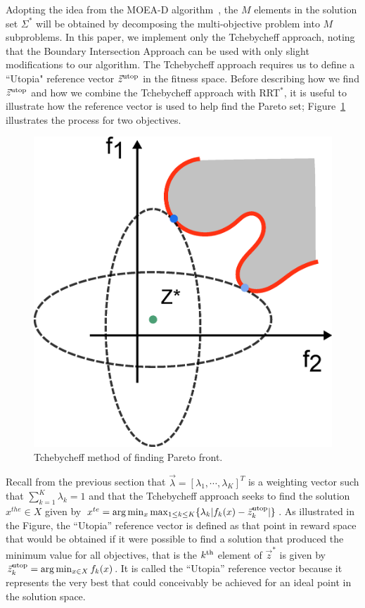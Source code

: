 \documentclass{article}
\begin{document}
Adopting the idea from the MOEA-D algorithm~\cite{4358754}, the $M$ elements in the solution set $\Sigma^{*}$ will be obtained by decomposing the multi-objective problem into $ M $ subproblems.  
In this paper, we implement only the Tchebycheff approach, noting that the Boundary Intersection Approach can be used with only slight modifications to our algorithm. The Tchebycheff approach requires us to define a ``Utopia" reference vector $ \vec{z}^{\rm utop} $ in the fitness space. 
Before describing how we find $ \vec{z}^{\rm utop} $ and how we combine the Tchebycheff approach with RRT$^{*}$, it is useful to illustrate how the reference vector is used to help find the Pareto set; Figure~\ref{fig:Tchebycheff} illustrates the process for two objectives.  
\begin{figure}
\centering
\includegraphics[width=0.6\linewidth]{fig/Tchebycheff2.png}
\caption{Tchebycheff method of finding Pareto front.}
\label{fig:Tchebycheff}
\end{figure}
Recall from the previous section that  $ \vec{\lambda} = [ \lambda_{1} , \cdots , \lambda_{K}  ]^{T} $ is a weighting vector such that $ \sum_{k=1}^{K} \lambda_{k} = 1 $ and that the Tchebycheff approach seeks to find the solution $ x^{the}\in X $ given by $ x^{te} = \arg\min_x \max_{1 \leq k \leq K}  \{ \lambda_{k} | f_{k}(x) - \vec{z}^{\rm utop}_{k}  | \} $.  
As illustrated in the Figure, the ``Utopia'' reference vector is defined as that point in reward space that would be obtained if it were possible to find a solution that produced the minimum value for all objectives, that is the $k^{\rm th}$ element of $\vec{z}^*$ is given by $\vec{z}^{\rm utop}_{k} = \arg \min_{x \in X} f_{k}(x)$.  
It is called the ``Utopia'' reference vector because it represents the very best that could conceivably be achieved for an ideal point in the solution space.
\end{document}
